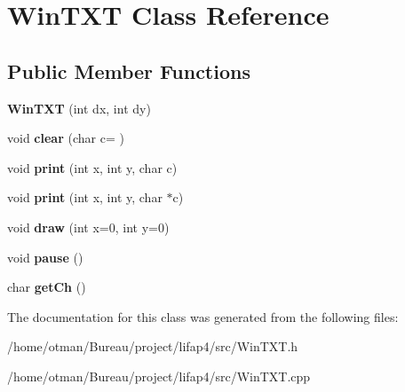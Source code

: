 \hypertarget{classWinTXT}{}\section{Win\+T\+XT Class Reference}
\label{classWinTXT}
\subsection*{Public Member Functions}
\begin{DoxyCompactItemize}
\item 
\mbox{\label{classWinTXT_ad471ddd48d2a7c43acccd1204e419527}} 
{\bfseries Win\+T\+XT} (int dx, int dy)
\item 
\mbox{\label{classWinTXT_a1b4cb203533f78bed29498591631f436}} 
void {\bfseries clear} (char c=\textquotesingle{} \textquotesingle{})
\item 
\mbox{\label{classWinTXT_a407cce45e7f81546540f4f8a9b85ce45}} 
void {\bfseries print} (int x, int y, char c)
\item 
\mbox{\label{classWinTXT_ad021d5fb9862b9ea7985f8cef50451e2}} 
void {\bfseries print} (int x, int y, char $\ast$c)
\item 
\mbox{\label{classWinTXT_af83a18827593465fc397983c97b4e886}} 
void {\bfseries draw} (int x=0, int y=0)
\item 
\mbox{\label{classWinTXT_a3e8793fd263bb51a62ec8a5e89904c49}} 
void {\bfseries pause} ()
\item 
\mbox{\label{classWinTXT_a418c66475403586ac57a80eceb409166}} 
char {\bfseries get\+Ch} ()
\end{DoxyCompactItemize}


The documentation for this class was generated from the following files\+:\begin{DoxyCompactItemize}
\item 
/home/otman/\+Bureau/project/lifap4/src/Win\+T\+X\+T.\+h\item 
/home/otman/\+Bureau/project/lifap4/src/Win\+T\+X\+T.\+cpp\end{DoxyCompactItemize}

